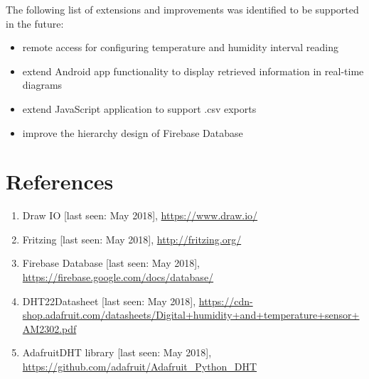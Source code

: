 \documentclass[a4paper,11pt]{article}
\begin{document}
The following list of extensions and improvements was identified to be supported in the future:
\begin{itemize}  
\item remote access for configuring temperature and humidity interval reading
\item extend Android app functionality to display retrieved information in real-time diagrams
\item extend JavaScript application to support .csv exports
\item improve the hierarchy design of Firebase Database
\end{itemize}

\newpage
\section{References}
\begin{enumerate}  
\item Draw IO [last seen: May 2018], \url{https://www.draw.io/}
\item Fritzing [last seen: May 2018], \url{http://fritzing.org/}
\item Firebase Database [last seen: May 2018], \url{https://firebase.google.com/docs/database/}
\item DHT22Datasheet [last seen: May 2018], \url{https://cdn-shop.adafruit.com/datasheets/Digital+humidity+and+temperature+sensor+AM2302.pdf}
\item AdafruitDHT library [last seen: May 2018], \url{https://github.com/adafruit/Adafruit\_Python\_DHT}
\end{enumerate}
\end{document}
